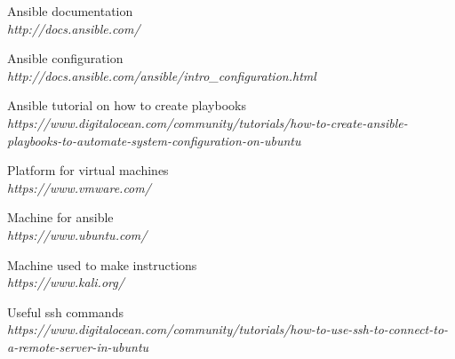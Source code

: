 \documentclass[12pt, a4paper]{article}
\begin{document}
\begin{thebibliography}{9}
\bibitem{} Ansible documentation\\
\textit{http://docs.ansible.com/}

\bibitem{} Ansible configuration\\
\textit{http://docs.ansible.com/ansible/intro\_configuration.html}

\bibitem{} Ansible tutorial on how to create playbooks\\
\textit{https://www.digitalocean.com/community/tutorials/how-to-create-ansible-playbooks-to-automate-system-configuration-on-ubuntu}

\bibitem{} Platform for virtual machines\\
\textit{https://www.vmware.com/}

\bibitem{} Machine for ansible\\
\textit{https://www.ubuntu.com/}

\bibitem{} Machine used to make instructions\\
\textit{https://www.kali.org/}

\bibitem{} Useful ssh commands\\
\textit{https://www.digitalocean.com/community/tutorials/how-to-use-ssh-to-connect-to-a-remote-server-in-ubuntu}



\end{thebibliography}
\end{document}
